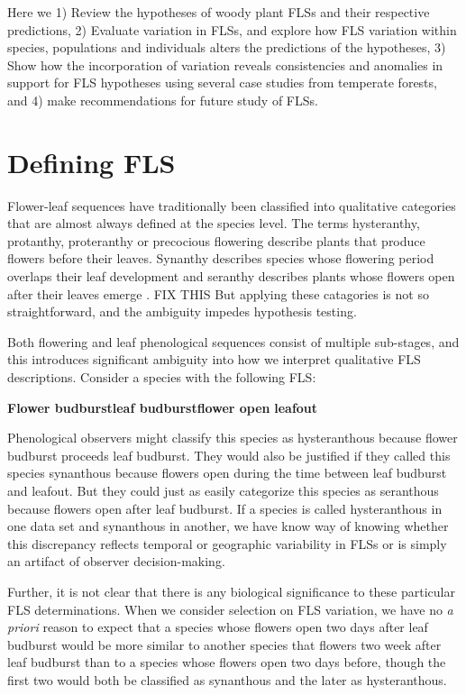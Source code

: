 \documentclass[12pt]{article}\usepackage[]{graphicx}\usepackage[]{color}
\begin{document}
\indent Here we 1) Review the hypotheses of woody plant FLSs and their respective predictions, 2) Evaluate variation in FLSs, and explore how FLS variation within species, populations and individuals alters the predictions of the hypotheses, 3) Show how the incorporation of variation reveals consistencies and anomalies in support for FLS hypotheses using several case studies from temperate forests, and 4) make recommendations for future study of FLSs. 

\section*{Defining FLS}

\indent\indent Flower-leaf sequences have traditionally been classified into qualitative categories that are almost always defined at the species level. The terms hysteranthy, protanthy, proteranthy or precocious flowering describe plants that produce flowers before their leaves. Synanthy describes species whose flowering period overlaps their leaf development and seranthy describes plants whose flowers open after their leaves emerge \citep{Lamont2011, Heinig1899}. FIX THIS But applying these catagories is not so straightforward, and the ambiguity impedes hypothesis testing.

Both flowering and leaf phenological sequences consist of multiple sub-stages, and this introduces significant ambiguity into how we interpret qualitative FLS descriptions. Consider a species with the following FLS:\\
\begin{center}
\textbf{Flower budburst}\rightarrow \textbf{leaf budburst}\rightarrow \textbf{flower open} \rightarrow \textbf{leafout}\\
\end{center}

\indent Phenological observers might classify this species as hysteranthous because flower budburst proceeds leaf budburst. They would also be justified if they called this species synanthous because flowers open during the time between leaf budburst and leafout. But they could just as easily categorize this species as seranthous because flowers open after leaf budburst. If a species is called hysteranthous in one data set and synanthous in another, we have know way of knowing whether this discrepancy reflects temporal or geographic variability in FLSs or is simply an artifact of observer decision-making. 

\indent Further, it is not clear that there is any biological significance to these particular FLS determinations. When we consider selection on FLS variation, we have no \textit{a priori} reason to expect that a species whose flowers open two days after leaf budburst would be more similar to another species that flowers two week after leaf budburst than to a species whose flowers open two days before, though the first two would both be classified as synanthous and the later as hysteranthous.\\
\end{document}
